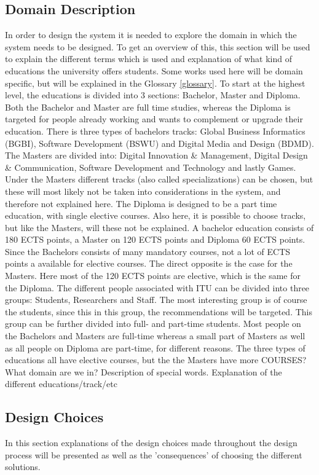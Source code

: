 \subsection{Domain Description}
In order to design the system it is needed to explore the domain in which the system needs to be designed. To get an overview of this, this section will be used to explain the different terms which is used and explanation of what kind of educations the university offers students. Some works used here will be domain specific, but will be explained in the Glossary \ref{glossary}.
To start at the highest level, the educations is divided into 3 sections: Bachelor, Master and Diploma. Both the Bachelor and Master are full time studies, whereas the Diploma is targeted for people already working and wants to complement or upgrade their education. There is three types of bachelors tracks: Global Business Informatics (BGBI), Software Development (BSWU) and Digital Media and Design (BDMD). The Masters are divided into: Digital Innovation \& Management, Digital Design \& Communication, Software Development and Technology and lastly Games. Under the Masters different tracks (also called specializations) can be chosen, but these will most likely not be taken into considerations in the system, and therefore not explained here. The Diploma is designed to be a part time education, with single elective courses. Also here, it is possible to choose tracks, but like the Masters, will these not be explained. 
A bachelor education consists of 180 ECTS points, a Master on 120 ECTS points and Diploma 60 ECTS points. Since the Bachelors consists of many mandatory courses, not a lot of ECTS points a available for elective courses. The direct opposite is the case for the Masters. Here most of the 120 ECTS points are elective, which is the same for the Diploma. 
The different people associated with ITU can be divided into three groups: Students, Researchers and Staff. The most interesting group is of course the students, since this in this group, the recommendations will be targeted. This group can be further divided into full- and part-time students. Most people on the Bachelors and Masters are full-time whereas a small part of Masters as well as all people on Diploma are part-time, for different reasons. 
The three types of educations all have elective courses, but the the Masters have more 
COURSES?
What domain are we in? Description of special words. Explanation of the different educations/track/etc

\subsection{Design Choices}
In this section explanations of the design choices made throughout the design process will be presented as well as the 'consequences' of choosing the different solutions. 
